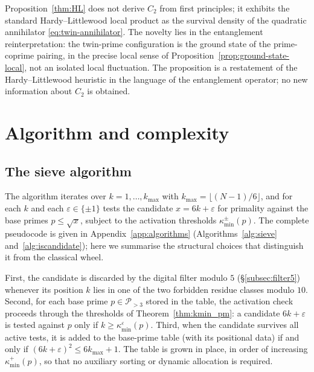 \documentclass[11pt]{amsart}
\numberwithin{equation}{section}
\newcommand{\cP}{\mathcal{P}}
\newcommand{\kmin}{\kappa_{\min}}
\newcommand{\kminp}{\kappa_{\min}^{+}}
\theoremstyle{plain}
\theoremstyle{definition}
\begin{document}
Proposition~\ref{thm:HL} does not derive $C_2$ from first principles;
it exhibits the standard Hardy--Littlewood local product as the
survival density of the quadratic annihilator
\eqref{eq:twin-annihilator}. The novelty lies in the entanglement
reinterpretation: the twin-prime configuration is the ground state of
the prime-coprime pairing, in the precise local sense of
Proposition~\ref{prop:ground-state-local}, not an isolated local
fluctuation. The proposition is a restatement of the
Hardy--Littlewood heuristic in the language of the entanglement
operator; no new information about $C_2$ is obtained.

\section{Algorithm and complexity}
\label{sec:complexity}

\subsection{The sieve algorithm}
\label{subsec:algorithm}

The algorithm iterates over $k=1,\dots,k_{\max}$ with
$k_{\max}=\lfloor(N-1)/6\rfloor$, and for each $k$ and each
$\varepsilon\in\{\pm 1\}$ tests the candidate $x=6k+\varepsilon$ for
primality against the base primes $p\le\sqrt{x}$, subject to the
activation thresholds $\kmin^\pm(p)$. The complete pseudocode is given
in Appendix~\ref{app:algorithms} (Algorithms~\ref{alg:sieve}
and~\ref{alg:iscandidate}); here we summarise the structural choices
that distinguish it from the classical wheel.

First, the candidate is discarded by the digital filter modulo $5$
(\S\ref{subsec:filter5}) whenever its position $k$ lies in one of the
two forbidden residue classes modulo $10$. Second, for each base
prime $p\in\cP_{>3}$ stored in the table, the activation check
proceeds through the thresholds of Theorem~\ref{thm:kmin_pm}: a
candidate $6k+\varepsilon$ is tested against $p$ only if
$k\ge\kappa_{\min}^{\varepsilon}(p)$. Third, when the candidate
survives all active tests, it is added to the base-prime table (with
its positional data) if and only if $(6k+\varepsilon)^2\le 6k_{\max}+1$.
The table is grown in place, in order of increasing
$\kminp(p)$, so that no auxiliary sorting or dynamic allocation is
required.
\end{document}
